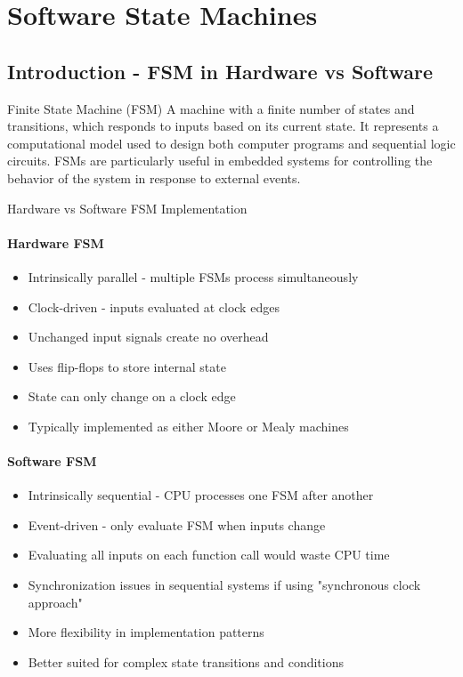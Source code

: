 \section{Software State Machines}

\subsection{Introduction - FSM in Hardware vs Software}

\begin{definition}{Finite State Machine (FSM)}
A machine with a finite number of states and transitions, which responds to inputs based on its current state. It represents a computational model used to design both computer programs and sequential logic circuits. FSMs are particularly useful in embedded systems for controlling the behavior of the system in response to external events.
\end{definition}

\begin{concept}{Hardware vs Software FSM Implementation}
\paragraph{Hardware FSM}
\begin{itemize}
    \item Intrinsically parallel - multiple FSMs process simultaneously
    \item Clock-driven - inputs evaluated at clock edges
    \item Unchanged input signals create no overhead
    \item Uses flip-flops to store internal state
    \item State can only change on a clock edge
    \item Typically implemented as either Moore or Mealy machines
\end{itemize}

\paragraph{Software FSM}
\begin{itemize}
    \item Intrinsically sequential - CPU processes one FSM after another
    \item Event-driven - only evaluate FSM when inputs change
    \item Evaluating all inputs on each function call would waste CPU time
    \item Synchronization issues in sequential systems if using "synchronous clock approach"
    \item More flexibility in implementation patterns
    \item Better suited for complex state transitions and conditions
\end{itemize}
\end{concept}

